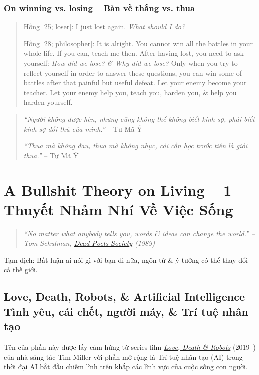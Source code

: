 \documentclass[12pt]{article}
\begin{document}
\subsubsection{On winning vs. losing -- Bàn về thắng vs. thua}

\begin{quote}
	{\sf Hồng [25; loser]}: I just lost again. {\it What should I do?}
	
	{\sf Hồng [28; philosopher]}: It is alright. You cannot win all the battles in your whole life. If you can, teach me then. After having lost, you need to ask yourself: {\it How did we lose? \& Why did we lose?} Only when you try to reflect yourself in order to answer these questions, you can win some of battles after that painful but useful defeat. Let your enemy become your teacher. Let your enemy help you, teach you, harden you, \& help you harden yourself.
\end{quote}

\begin{quotation}
	{\it``Người không được hèn, nhưng cũng không thể không biết kính sợ, phải biết kính sợ đối thủ của mình.''} -- {\sc Tư Mã Ý}
	
	{\it``Thua mà không đau, thua mà không nhục, cái cần học trước tiên là giỏi thua.''} -- {\sc Tư Mã Ý}
\end{quotation}


\section{A Bullshit Theory on Living -- 1 Thuyết Nhảm Nhí Về Việc Sống}
\label{sect: bullshit theory on live}

\begin{quotation}\it
	``No matter what anybody tells you, words \& ideas can change the world.'' -- {\sc Tom Schulman}, \href{https://www.imdb.com/title/tt0097165}{Dead Poets Society} (1989)
\end{quotation}
{\sf Tạm dịch}: Bất luận ai nói gì với bạn đi nữa, ngôn từ \& ý tưởng có thể thay đổi cả thế giới.

\subsection{Love, Death, Robots, \& Artificial Intelligence -- Tình yêu, cái chết, người máy, \& Trí tuệ nhân tạo}
Tên của phần này được lấy cảm hứng từ series film \href{https://www.imdb.com/title/tt9561862}{\it Love, Death \& Robots} (2019--) của nhà sáng tác {\sc Tim Miller} với phần mở rộng là Trí tuệ nhân tạo (AI) trong thời đại AI bắt đầu chiếm lĩnh trên khắp các lĩnh vực của cuộc sống con người.
\end{document}
